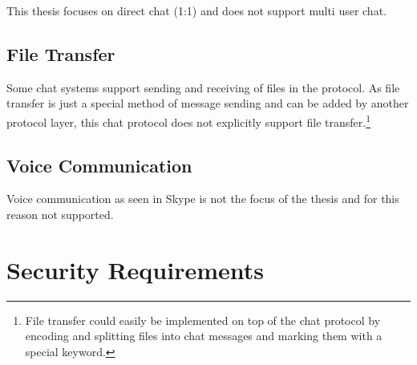 This thesis focuses on direct chat (1:1) and does not support multi user chat.
\subsection{File Transfer}
Some chat systems support sending and receiving of files in the protocol.
As file transfer is just a special method of message sending and can be
added by another protocol layer, this chat protocol does not explicitly
support file transfer.\footnote{File transfer could easily be implemented
on top of the chat protocol by encoding and splitting
files into chat messages and marking them with a special keyword.}
\subsection{Voice Communication}
Voice communication as seen in Skype is not the focus of the thesis and for
this reason not supported.
\section{Security Requirements}

